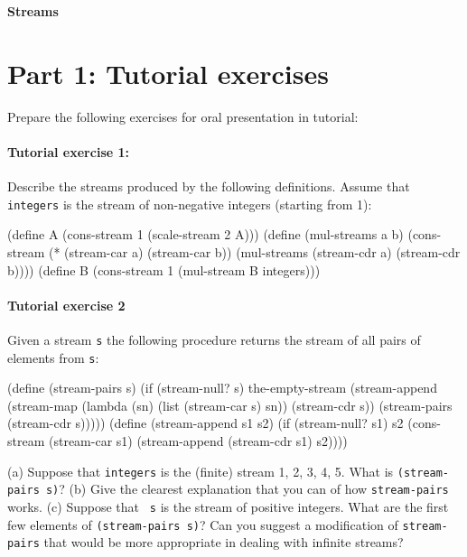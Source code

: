 



\begin{center}
{\bf Streams}
\end{center}

\section{Part 1: Tutorial exercises}

Prepare the following exercises for oral presentation in tutorial:

\paragraph{Tutorial exercise 1:} 
Describe the streams produced by the following definitions.  Assume
that {\tt integers} is the stream of non-negative integers (starting
from 1):

\beginlisp 
(define A (cons-stream 1 (scale-stream 2 A)))
\null
(define (mul-streams a b)
  (cons-stream
   (* (stream-car a) (stream-car b))
   (mul-streams (stream-cdr a)
                (stream-cdr b))))
\null
(define B (cons-stream 1 (mul-stream B integers)))
\endlisp

\paragraph{Tutorial exercise 2} 

Given a stream {\tt s} the following procedure returns the stream of
all pairs of elements from {\tt s}:

\beginlisp
(define (stream-pairs s)
  (if (stream-null? s)
      the-empty-stream
      (stream-append
       (stream-map
        (lambda (sn) (list (stream-car s) sn))
        (stream-cdr s))
       (stream-pairs (stream-cdr s)))))
\null
(define (stream-append s1 s2)
  (if (stream-null? s1)
      s2
      (cons-stream (stream-car s1)
                   (stream-append (stream-cdr s1) s2))))
\endlisp

\noindent
(a) Suppose that {\tt integers} is the (finite) stream 1, 2, 3, 4, 5.
What is {\tt (stream-pairs s)}?  (b) Give the clearest explanation
that you can of how {\tt stream-pairs} works.  (c) Suppose that {\tt
s} is the stream of positive integers.  What are the first few
elements of {\tt (stream-pairs s)}?  Can you suggest a modification of
{\tt stream-pairs} that would be more appropriate in dealing with
infinite streams?


